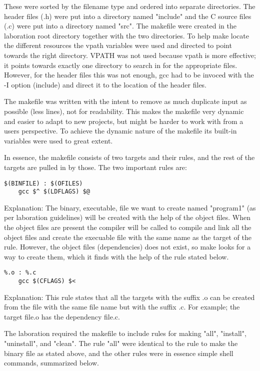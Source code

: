 \documentclass[a4paper,10pt]{article}
\begin{document}
These were sorted by the filename type and ordered into separate directories. The header files (.h) were put into a directory named "include" and the C source files (.c) were put into a directory named "src". The makefile were created in the laboration root directory together with the two directories. To help make locate the different resources the vpath variables were used and directed to point towards the right directory. VPATH was not used because vpath is more effective; it points towards exactly one directory to search in for the appropriate files. However, for the header files this was not enough, gcc had to be invoced with the -I option (include) and direct it to the location of the header files.

The makefile was written with the intent to remove as much duplicate input as possible (less lines), not for readability. This makes the makefile very dynamic and easier to adapt to new projects, but might be harder to work with from a users perspective. To achieve the dynamic nature of the makefile its built-in variables were used to great extent.

In essence, the makefile consists of two targets and their rules, and the rest of the targets are pulled in by those. The two important rules are:

\begin{verbatim}
$(BINFILE) : $(OFILES)
    gcc $^ $(LDFLAGS) $@
\end{verbatim}

Explanation: The binary, executable, file we want to create named "program1" (as per laboration guidelines) will be created with the help of the object files. When the object files are present the compiler will be called to compile and link all the object files and create the execuable file with the same name as the target of the rule. However, the object files (dependencies) does not exist, so make looks for a way to create them, which it finds with the help of the rule stated below.

\begin{verbatim}
%.o : %.c
    gcc $(CFLAGS) $<
\end{verbatim}

Explanation: This rule states that all the targets with the suffix .o can be created from the file with the same file name but with the suffix .c. For example; the target file.o has the dependency file.c.

The laboration required the makefile to include rules for making "all", "install", "uninstall", and "clean". The rule "all" were identical to the rule to make the binary file as stated above, and the other rules were in essence simple shell commands, summarized below. 
\end{document}

